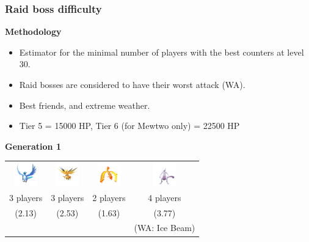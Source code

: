 \documentclass[8pt,aspectratio=169,compress]{beamer}
\begin{document}
\begin{frame}
\begin{tiny}
\frametitle{Raid boss difficulty}

\begin{block}{}
\textbf{Methodology}
\begin{itemize}
\item Estimator for the minimal number of players with the best counters at level 30.
\item Raid bosses are considered to have their worst attack (WA).
\item Best friends, and extreme weather.
\item Tier 5 = 15000 HP, Tier 6 (for Mewtwo only) = 22500 HP
\end{itemize}

\bigskip

\textbf{Generation 1}
\begin{center}
\begin{tabular}{cccc}
\includegraphics[width=1cm]{../../images/pokemon/Articuno} & 
\includegraphics[width=1cm]{../../images/pokemon/Zapdos} & 
\includegraphics[width=1cm]{../../images/pokemon/Moltres} & 
\includegraphics[width=1cm]{../../images/pokemon/Mewtwo} \\
3 players & 3 players & 2 players & 4 players \\
(2.13) & (2.53) & (1.63) & (3.77) \\
& & & (WA: Ice Beam) \\
\end{tabular}
\end{center}

\bigskip


\end{block}
\end{tiny}
\end{frame}
\end{document}
